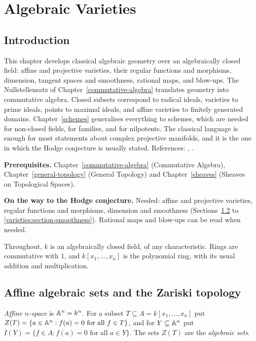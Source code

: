\chapter{Algebraic Varieties}\label{varieties}

\section{Introduction}\label{varieties:section-introduction}

This chapter develops classical algebraic geometry over an algebraically closed field: affine and projective varieties, their regular
functions and morphisms, dimension, tangent spaces and smoothness, rational maps, and blow-ups. The Nullstellensatz of
Chapter~\ref{commutative-algebra} translates geometry into commutative algebra. Closed subsets correspond to radical ideals, varieties to
prime ideals, points to maximal ideals, and affine varieties to finitely generated domains. Chapter~\ref{schemes} generalises everything to
schemes, which are needed for non-closed fields, for families, and for nilpotents. The classical language is enough for most statements
about complex projective manifolds, and it is the one in which the Hodge conjecture is usually stated. References:
\cite[Chapter I]{hartshorne-ag}, \cite[Chapter 1]{griffiths-harris}.

\noindent\textbf{Prerequisites.} Chapter~\ref{commutative-algebra} (Commutative Algebra), Chapter~\ref{general-topology} (General Topology)
and Chapter~\ref{sheaves} (Sheaves on Topological Spaces).

\noindent\textbf{On the way to the Hodge conjecture.} Needed: affine and projective varieties, regular functions and morphisms, dimension and smoothness (Sections~\ref{varieties:section-affine} to \ref{varieties:section-smoothness}). Rational
maps and blow-ups can be read when needed.

Throughout, $k$ is an algebraically closed field, of any characteristic. Rings are commutative with $1$, and $k[x_1, \ldots, x_n]$ is the
polynomial ring, with its usual addition and multiplication.

\section{Affine algebraic sets and the Zariski topology}\label{varieties:section-affine}

\begin{definition}\label{varieties:definition-zariski}
\emph{Affine $n$-space} is $\mathbb{A}^n = k^n$. For a subset $T \subseteq A = k[x_1, \ldots, x_n]$ put $Z(T) = \{a \in \mathbb{A}^n : f(a) = 0 \text{ for all } f \in T\}$,
and for $Y \subseteq \mathbb{A}^n$ put $I(Y) = \{f \in A : f(a) = 0 \text{ for all } a \in Y\}$. The sets $Z(T)$ are the \emph{algebraic sets}.
\end{definition}


